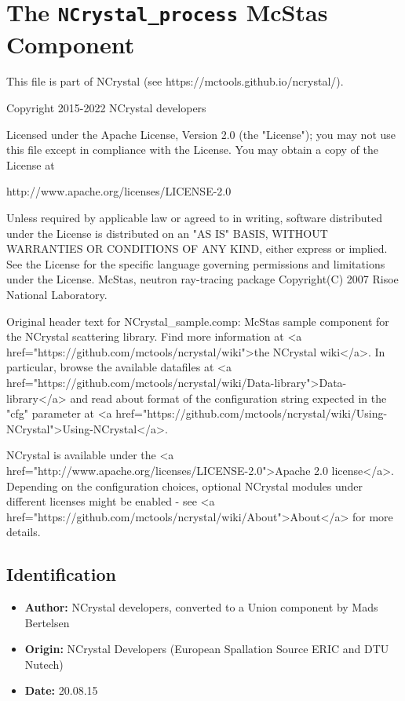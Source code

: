 \section{The \texttt{NCrystal\_process} McStas Component}
This file is part of NCrystal (see https://mctools.github.io/ncrystal/).

Copyright 2015-2022 NCrystal developers

Licensed under the Apache License, Version 2.0 (the "License");
you may not use this file except in compliance with the License.
You may obtain a copy of the License at

http://www.apache.org/licenses/LICENSE-2.0

Unless required by applicable law or agreed to in writing, software
distributed under the License is distributed on an "AS IS" BASIS,
WITHOUT WARRANTIES OR CONDITIONS OF ANY KIND, either express or implied.
See the License for the specific language governing permissions and
limitations under the License.
McStas, neutron ray-tracing package
Copyright(C) 2007 Risoe National Laboratory.

Original header text for NCrystal\_sample.comp:
McStas sample component for the NCrystal scattering library. Find more
information at \textless{}a href="https://github.com/mctools/ncrystal/wiki"\textgreater{}the NCrystal
wiki\textless{}/a\textgreater{}. In particular, browse the available datafiles at \textless{}a
href="https://github.com/mctools/ncrystal/wiki/Data-library"\textgreater{}Data-library\textless{}/a\textgreater{}
and read about format of the configuration string expected in the "cfg"
parameter at \textless{}a
href="https://github.com/mctools/ncrystal/wiki/Using-NCrystal"\textgreater{}Using-NCrystal\textless{}/a\textgreater{}.

NCrystal is available under the \textless{}a
href="http://www.apache.org/licenses/LICENSE-2.0"\textgreater{}Apache 2.0 license\textless{}/a\textgreater{}.
Depending on the configuration choices, optional NCrystal modules under
different licenses might be enabled - see \textless{}a
href="https://github.com/mctools/ncrystal/wiki/About"\textgreater{}About\textless{}/a\textgreater{} for more
details.

\subsection*{Identification}
\begin{itemize}
  \item \textbf{Author:} NCrystal developers, converted to a Union component by Mads Bertelsen
  \item \textbf{Origin:} NCrystal Developers (European Spallation Source ERIC and DTU Nutech)
  \item \textbf{Date:} 20.08.15
\end{itemize}

